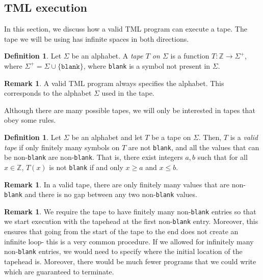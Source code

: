 \documentclass{article}
\theoremstyle{definition}
\newtheorem{definition}[rules]{Definition}
\newtheorem{remark}[rules]{Remark}
\theoremstyle{plain}
\begin{document}
    \subsection{TML execution}
    In this section, we discuss how a valid TML program can execute a tape. The tape we will be using has infinite spaces in both directions.
    \begin{definition}
        Let $\Sigma$ be an alphabet. A \emph{tape $T$ on $\Sigma$} is a function $T: \mathbb{Z} \to \Sigma^+$, where $\Sigma^+ = \Sigma \cup \{\texttt{blank}\}$, where \texttt{blank} is a symbol not present in $\Sigma$.
    \end{definition}
    \begin{remark}
        A valid TML program always specifies the alphabet. This corresponds to the alphabet $\Sigma$ used in the tape.
    \end{remark}
    \noindent Although there are many possible tapes, we will only be interested in tapes that obey some rules.
    \begin{definition}
        Let $\Sigma$ be an alphabet and let $T$ be a tape on $\Sigma$. Then, $T$ is a \emph{valid tape} if only finitely many symbols on $T$ are not \texttt{blank}, and all the values that can be non-\texttt{blank} are non-\texttt{blank}. That is, there exist integers $a, b$ such that for all $x \in \mathbb{Z}$, $T(x)$ is not \texttt{blank} if and only $x \geq a$ and $x \leq b$.
    \end{definition}
    \begin{remark}
        In a valid tape, there are only finitely many values that are non-\texttt{blank} and there is no gap between any two non-\texttt{blank} values.
    \end{remark}
    \begin{remark}
        We require the tape to have finitely many non-\texttt{blank} entries so that we start execution with the tapehead at the first non-\texttt{blank} entry. Moreover, this ensures that going from the start of the tape to the end does not create an infinite loop- this is a very common procedure. If we allowed for infinitely many non-\texttt{blank} entries, we would need to specify where the initial location of the tapehead is. Moreover, there would be much fewer programs that we could write which are guaranteed to terminate.
    \end{remark}
\end{document}
